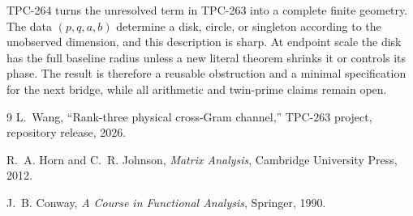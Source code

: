 \documentclass[11pt]{article}
\theoremstyle{definition}
\begin{document}
TPC-264 turns the unresolved term in TPC-263 into a complete finite geometry.
The data $(p,q,a,b)$ determine a disk, circle, or singleton according to the
unobserved dimension, and this description is sharp.  At endpoint scale the
disk has the full baseline radius unless a new literal theorem shrinks it or
controls its phase.  The result is therefore a reusable obstruction and a
minimal specification for the next bridge, while all arithmetic and twin-prime
claims remain open.

\begin{thebibliography}{9}
L.~Wang, ``Rank-three physical cross-Gram channel,'' TPC-263 project,
repository release, 2026.

R.~A. Horn and C.~R. Johnson, \emph{Matrix Analysis}, Cambridge University
Press, 2012.

J.~B. Conway, \emph{A Course in Functional Analysis}, Springer, 1990.
\end{thebibliography}
\end{document}
